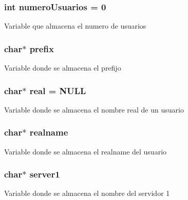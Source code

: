 \subsubsection[{numero\+Usuarios}]{\setlength{\rightskip}{0pt plus 5cm}int numero\+Usuarios = 0}\label{_g-2361-06-_p1-_server_8c_ac9a5ec6f534d2a8e2a870179807d32dc}
Variable que almacena el numero de usuarios \hypertarget{_g-2361-06-_p1-_server_8c_ad2849cf781a4db22cc1b31eaaee50a4f}{}
\subsubsection[{prefix}]{\setlength{\rightskip}{0pt plus 5cm}char$\ast$ prefix}\label{_g-2361-06-_p1-_server_8c_ad2849cf781a4db22cc1b31eaaee50a4f}
Variable donde se almacena el prefijo \hypertarget{_g-2361-06-_p1-_server_8c_af832f551e1c343666c3d2a55834139a0}{}
\subsubsection[{real}]{\setlength{\rightskip}{0pt plus 5cm}char$\ast$ real = N\+U\+L\+L}\label{_g-2361-06-_p1-_server_8c_af832f551e1c343666c3d2a55834139a0}
Variable donde se almacena el nombre real de un usuario \hypertarget{_g-2361-06-_p1-_server_8c_a980ab011cd3d327b370c042833f1dc08}{}
\subsubsection[{realname}]{\setlength{\rightskip}{0pt plus 5cm}char$\ast$ realname}\label{_g-2361-06-_p1-_server_8c_a980ab011cd3d327b370c042833f1dc08}
Variable donde se almacena el realname del usuario \hypertarget{_g-2361-06-_p1-_server_8c_a9045e9ee0087b60273244cd6c2f91a5f}{}
\subsubsection[{server1}]{\setlength{\rightskip}{0pt plus 5cm}char$\ast$ server1}\label{_g-2361-06-_p1-_server_8c_a9045e9ee0087b60273244cd6c2f91a5f}
Variable donde se almacena el nombre del servidor 1 \hypertarget{_g-2361-06-_p1-_server_8c_a70dd311bef3d0b4160a7ce0706f8f4cc}{}
